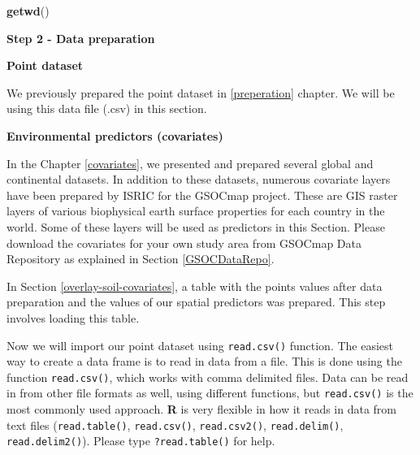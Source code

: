 \documentclass[10pt,b5paper,]{book}
\newenvironment{Shaded}{\begin{snugshade}}{\end{snugshade}}
\newcommand{\CommentTok}[1]{\textcolor[rgb]{0.56,0.35,0.01}{\textit{#1}}}
\newcommand{\KeywordTok}[1]{\textcolor[rgb]{0.13,0.29,0.53}{\textbf{#1}}}
\newcommand{\NormalTok}[1]{#1}
\newcommand{\OperatorTok}[1]{\textcolor[rgb]{0.81,0.36,0.00}{\textbf{#1}}}
\newcommand{\StringTok}[1]{\textcolor[rgb]{0.31,0.60,0.02}{#1}}
\theoremstyle{definition}
\theoremstyle{definition}
\theoremstyle{definition}
\theoremstyle{remark}
\begin{document}
\begin{Shaded}
\begin{Highlighting}[]
\KeywordTok{getwd}\NormalTok{()}
\end{Highlighting}
\end{Shaded}

\textbf{Step 2 - Data preparation}

\textbf{Point dataset}

We previously prepared the point dataset in \ref{preperation} chapter.
We will be using this data file (.csv) in this section.

\textbf{Environmental predictors (covariates)}

In the Chapter \ref{covariates}, we presented and prepared several
global and continental datasets. In addition to these datasets, numerous
covariate layers have been prepared by ISRIC for the GSOCmap project.
These are GIS raster layers of various biophysical earth surface
properties for each country in the world. Some of these layers will be
used as predictors in this Section. Please download the covariates for
your own study area from GSOCmap Data Repository as explained in Section
\ref{GSOCDataRepo}.

In Section \ref{overlay-soil-covariates}, a table with the points values
after data preparation and the values of our spatial predictors was
prepared. This step involves loading this table.

Now we will import our point dataset using \texttt{read.csv()} function.
The easiest way to create a data frame is to read in data from a file.
This is done using the function \texttt{read.csv()}, which works with
comma delimited files. Data can be read in from other file formats as
well, using different functions, but \texttt{read.csv()} is the most
commonly used approach. \textbf{R} is very flexible in how it reads in
data from text files (\texttt{read.table()}, \texttt{read.csv()},
\texttt{read.csv2()}, \texttt{read.delim()}, \texttt{read.delim2()}).
Please type \texttt{?read.table()} for help.

\begin{Shaded}
\end{Shaded}
\end{document}
